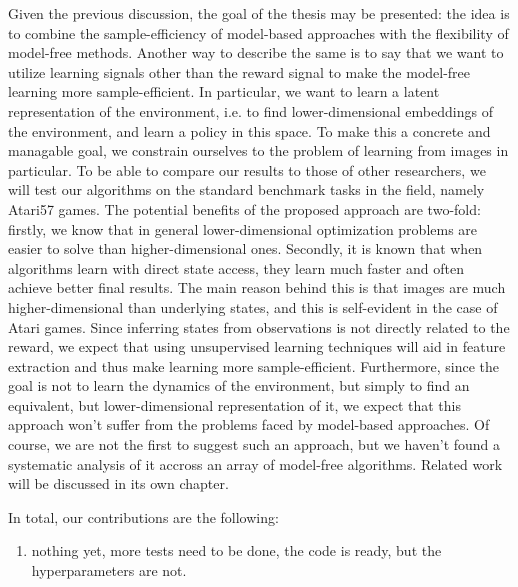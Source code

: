 Given the previous discussion, the goal of the thesis may be presented:
the idea is to combine the sample-efficiency of model-based approaches
with the flexibility of model-free methods.
Another way to describe the same is to say that we want
to utilize learning signals other than the reward signal
to make the model-free learning more sample-efficient.
In particular, we want to learn a latent representation of the environment,
i.e. to find lower-dimensional embeddings of the environment,
and learn a policy in this space.
To make this a concrete and managable goal,
we constrain ourselves to the problem of learning from images in particular.
To be able to compare our results to those of other researchers,
we will test our algorithms on the standard benchmark tasks in the field,
namely Atari57 games.
The potential benefits of the proposed approach are two-fold:
firstly, we know that in general lower-dimensional optimization problems
are easier to solve than higher-dimensional ones.
Secondly, it is known that when algorithms learn with direct state access,
they learn much faster and often achieve better final results.
The main reason behind this is that images are much higher-dimensional
than underlying states, and this is self-evident in the case of Atari games.
Since inferring states from observations is not directly related to the reward,
we expect that using unsupervised learning techniques will aid in feature extraction
and thus make learning more sample-efficient.
Furthermore, since the goal is not to learn the dynamics of the environment,
but simply to find an equivalent, but lower-dimensional representation of it,
we expect that this approach won't suffer from the problems faced
by model-based approaches.
Of course, we are not the first to suggest such an approach,
but we haven't found a systematic analysis of it accross an array of
model-free algorithms.
Related work will be discussed in its own chapter.

In total, our contributions are the following:
\begin{enumerate}
		\item nothing yet, more tests need to be done, the code is ready,
				but the hyperparameters are not.
\end{enumerate}





